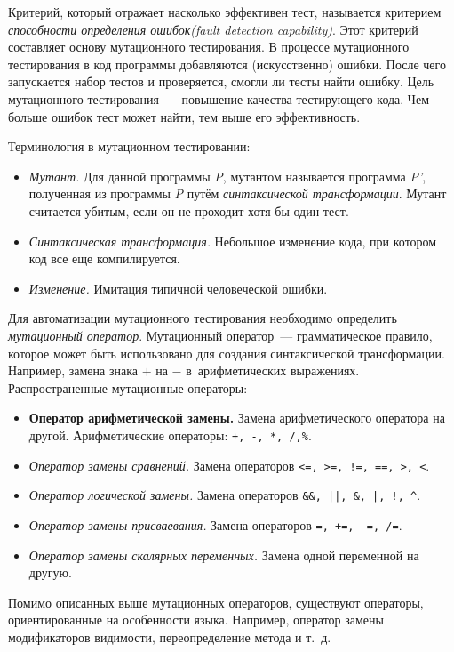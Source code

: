 Критерий, который отражает насколько эффективен тест, называется критерием \textit{способности определения ошибок(fault detection capability)}. Этот критерий составляет основу мутационного тестирования. В процессе мутационного тестирования в код программы добавляются (искусственно) ошибки. После чего запускается набор тестов и проверяется, смогли ли тесты найти ошибку. Цель мутационного тестирования~--- повышение качества тестирующего кода. Чем больше ошибок тест может найти, тем выше его эффективность.

Терминология в мутационном тестировании:

\begin{itemize}
	\item \textit{Мутант.} Для данной программы \textit{P}, мутантом называется программа \textit{P'}, полученная из программы \textit{P} путём \textit{синтаксической трансформации}. Мутант считается убитым, если он не проходит хотя бы один тест.
	\item \textit{Синтаксическая трансформация.} Небольшое изменение кода, при котором код все еще компилируется.
	\item \textit{Изменение.} Имитация типичной человеческой ошибки. 
\end{itemize}

Для автоматизации мутационного тестирования необходимо определить \textit{мутационный оператор}. Мутационный оператор~--- грамматическое правило, которое может быть использовано для создания синтаксической трансформации. Например, замена знака \(+\) на 
\(-\) в~арифметических выражениях. Распространенные мутационные операторы:

\begin{itemize}
	\item \textbf{Оператор арифметической замены.} Замена арифметического оператора на другой. Арифметические операторы: \texttt{+, -, *, /,\%}.
	\item \textit{Оператор замены сравнений.} Замена операторов \texttt{<=, >=, !=, ==, >, <}.
	\item \textit{Оператор логической замены.} Замена операторов \texttt{\&\&, ||, \&, |, !, \^}.
	\item \textit{Оператор замены присваевания.} Замена операторов \texttt{=, +=, -=, /=}.
	\item \textit{Оператор замены скалярных переменных.}  Замена одной переменной на другую.
\end{itemize}

Помимо описанных выше мутационных операторов, существуют операторы, ориентированные на особенности языка. Например, оператор замены модификаторов видимости, переопределение метода и т.~д.


